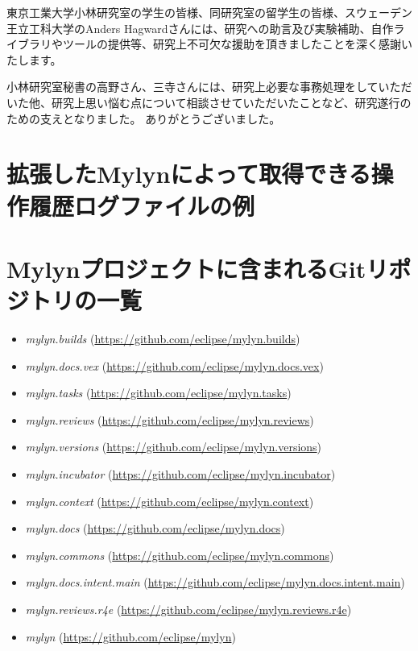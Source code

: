 \documentclass[a4paper]{jsbook}
\begin{document}
東京工業大学小林研究室の学生の皆様、同研究室の留学生の皆様、スウェーデン王立工科大学のAnders Hagwardさんには、研究への助言及び実験補助、自作ライブラリやツールの提供等、研究上不可欠な援助を頂きましたことを深く感謝いたします。

小林研究室秘書の高野さん、三寺さんには、研究上必要な事務処理をしていただいた他、研究上思い悩む点について相談させていただいたことなど、研究遂行のための支えとなりました。
ありがとうございました。

\appendix
\chapter{拡張したMylynによって取得できる操作履歴ログファイルの例}\label{mylyn_log_appendix}

\chapter{Mylynプロジェクトに含まれるGitリポジトリの一覧}\label{mylyn_repo_appendix}
\begin{itemize}
\item {\it mylyn.builds} (\url{https://github.com/eclipse/mylyn.builds})
\item {\it mylyn.docs.vex} (\url{https://github.com/eclipse/mylyn.docs.vex})
\item {\it mylyn.tasks} (\url{https://github.com/eclipse/mylyn.tasks})
\item {\it mylyn.reviews} (\url{https://github.com/eclipse/mylyn.reviews})
\item {\it mylyn.versions} (\url{https://github.com/eclipse/mylyn.versions})
\item {\it mylyn.incubator} (\url{https://github.com/eclipse/mylyn.incubator})
\item {\it mylyn.context} (\url{https://github.com/eclipse/mylyn.context})
\item {\it mylyn.docs} (\url{https://github.com/eclipse/mylyn.docs})
\item {\it mylyn.commons} (\url{https://github.com/eclipse/mylyn.commons})
\item {\it mylyn.docs.intent.main} (\url{https://github.com/eclipse/mylyn.docs.intent.main})
\item {\it mylyn.reviews.r4e} (\url{https://github.com/eclipse/mylyn.reviews.r4e})
\item {\it mylyn} (\url{https://github.com/eclipse/mylyn})
\end{itemize}


\backmatter


\end{document}
